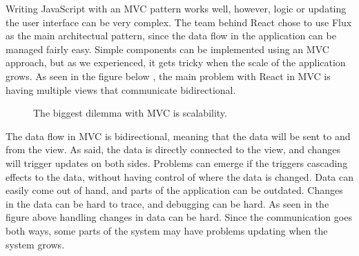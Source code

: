 Writing JavaScript with an MVC pattern works well, however, logic or updating the user interface can be very complex. The team behind React chose to use Flux as the main architectual pattern, since the data flow in the application can be managed fairly easy. Simple components can be implemented using an MVC approach, but as we experienced, it gets tricky when the scale of the application grows. As seen in the figure below , the main problem with React in MVC is having multiple views that communicate bidirectional.

\begin{figure}[h]
\centering
\scalebox{1}{{}}
\caption{The biggest dilemma with MVC is scalability.}
\end{figure}

The data flow in MVC is bidirectional, meaning that the data will be sent to and from the view. As said, the data is directly connected to the view, and changes will trigger updates on both sides. Problems can emerge if the triggers cascading effects to the data, without having control of where the data is changed. Data can easily come out of hand, and parts of the application can be outdated. Changes in the data can be hard to trace, and debugging can be hard. As seen in the figure above  handling changes in data can be hard. Since the communication goes both ways, some parts of the system may have problems updating when the system grows.

